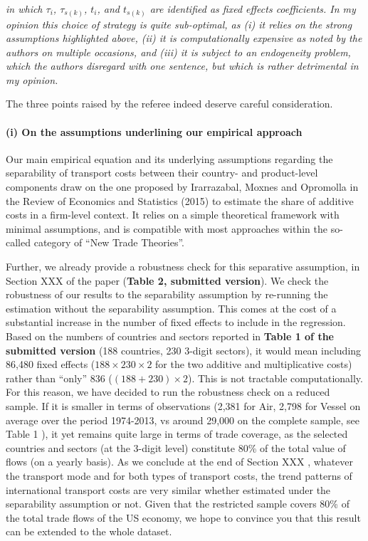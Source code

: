 \documentclass[a4paper,12pt]{article}
\begin{document}
\textit{in which $\tau_i$, $\tau_{s(k)}$, $t_i$, and $t_{s(k)}$ are identified as fixed effects coefficients.
In my opinion this choice of strategy is quite sub-optimal, as (i) it relies on
the strong assumptions highlighted above, (ii) it is computationally expensive
as noted by the authors on multiple occasions, and (iii) it is subject to an
endogeneity problem, which the authors disregard with one sentence, but which
is rather detrimental in my opinion.}

The three points raised by the referee indeed deserve careful consideration.

\paragraph{(i) On the assumptions underlining our empirical approach}
Our main empirical equation and its underlying assumptions regarding the separability of transport costs between their country- and product-level components draw on the one proposed by Irarrazabal, Moxnes and Opromolla in the Review of Economics and Statistics (2015) to estimate the share of additive costs in a firm-level context. It relies on a simple theoretical framework with minimal assumptions, and is compatible with most approaches within the so-called category of ``New Trade Theories''.

Further, we already provide a robustness check for this separative assumption, in Section XXX of the paper (\textbf{Table 2, submitted version}). We check the robustness of our results to the separability assumption by re-running the estimation without the separability assumption. This comes at the cost of a substantial increase in the number of fixed effects to include in the regression. Based on the numbers of countries and sectors reported in \textbf{Table 1 of the submitted version} (188 countries, 230 3-digit sectors), it would mean including 86,480 fixed effects ($188\times230\times2$ for the two additive and multiplicative costs) rather than ``only'' 836 ($(188+230)\times 2$). This is not tractable computationally. For this reason, we have decided to run the robustness check on a reduced sample. If it is smaller in terms of observations (2,381 for Air, 2,798 for Vessel on average over the period 1974-2013, vs around 29,000 on the complete sample, see Table 1 ), it yet remains quite large in terms of trade coverage, as the selected countries and sectors (at the 3-digit level) constitute 80\% of the total value of flows (on a yearly basis). As we conclude at the end of Section XXX , whatever the transport mode and for both types of transport costs, the trend patterns of international transport costs are very similar whether estimated under the separability assumption or not. Given that the restricted sample covers 80\% of the total trade flows of the US economy, we hope to convince you that this result can be extended to the whole dataset.
\end{document}
